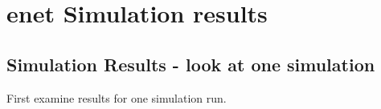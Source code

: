 \documentclass[
]{book}
\begin{document}
\hypertarget{enet-simulation-results}{%
\section*{enet Simulation results}\label{enet-simulation-results}}

\hypertarget{simulation-results---look-at-one-simulation-1}{%
\subsection*{Simulation Results - look at one simulation}\label{simulation-results---look-at-one-simulation-1}}

First examine results for one simulation run.
\end{document}
